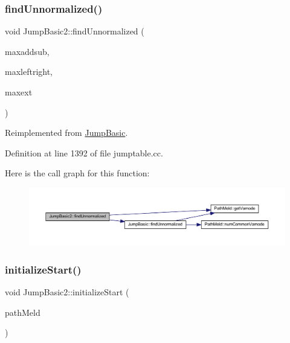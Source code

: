 \subsubsection{\texorpdfstring{findUnnormalized()}{findUnnormalized()}}
{\footnotesize\ttfamily void Jump\+Basic2\+::find\+Unnormalized (\begin{DoxyParamCaption}\item[{uint4}]{maxaddsub,  }\item[{uint4}]{maxleftright,  }\item[{uint4}]{maxext }\end{DoxyParamCaption})\hspace{0.3cm}{\ttfamily [virtual]}}



Reimplemented from \mbox{\hyperlink{class_jump_basic_a2d542e5a6b74bd116d89ba4e5bb4da9b}{Jump\+Basic}}.



Definition at line 1392 of file jumptable.\+cc.

Here is the call graph for this function\+:
\nopagebreak
\begin{figure}[H]
\begin{center}
\leavevmode
\includegraphics[width=350pt]{class_jump_basic2_ab5d1cebab5d2f98d0caf6fc551b29980_cgraph}
\end{center}
\end{figure}
\mbox{\label{class_jump_basic2_ac228c931935854c24c0e4d7893e93510}} 
\subsubsection{\texorpdfstring{initializeStart()}{initializeStart()}}
{\footnotesize\ttfamily void Jump\+Basic2\+::initialize\+Start (\begin{DoxyParamCaption}\item[{const \mbox{\hyperlink{class_path_meld}{Path\+Meld}} \&}]{path\+Meld }\end{DoxyParamCaption})}




